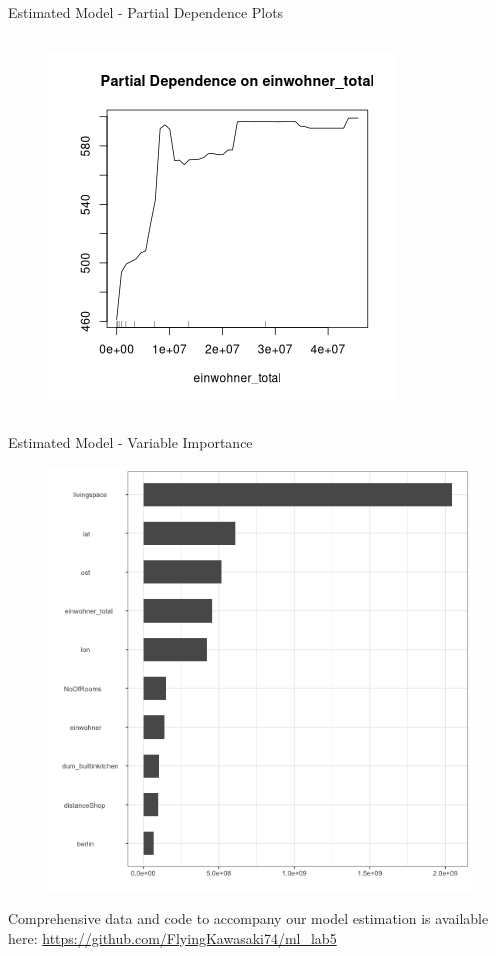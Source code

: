 \documentclass[11pt]{beamer}\usepackage[]{graphicx}\usepackage[]{color}
\begin{document}
\begin{frame}{Estimated Model - Partial Dependence Plots}
\begin{columns}[t]
\begin{column}{.5\linewidth}
\begin{figure}
        \includegraphics[width=0.6\linewidth]{Partial_Dependence_einwohner_total.png}
       \end{figure}
\end{column}
\end{columns}
\end{frame}

\begin{frame}{Estimated Model - Variable Importance}
\begin{figure}
\centering
\includegraphics[width=0.6\linewidth]{Histogramm.png}
\end{figure}
\end{frame}

\begin{frame}{}
Comprehensive data and code to accompany our model estimation is available here: 
\url{https://github.com/FlyingKawasaki74/ml_lab5}
\end{frame}
\end{document}

